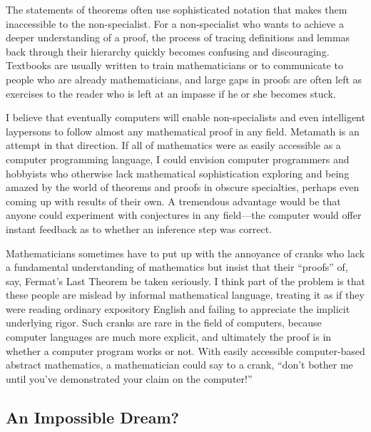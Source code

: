 The statements of theorems often use sophisticated notation that makes them
inaccessible to the non-specialist.  For a non-specialist who wants to achieve
a deeper understanding of a proof, the process of tracing definitions and
lemmas back through their hierarchy quickly becomes confusing
and discouraging.  Textbooks are usually written to train mathematicians or to
communicate to people who are already mathematicians, and large gaps in proofs
are often left as exercises to the reader who is left at an impasse if he or
she becomes stuck.

I believe that eventually computers will enable non-specialists and even
intelligent laypersons to follow almost any mathematical proof in any field.
Metamath is an attempt in that direction.  If all of mathematics were as
easily accessible as a computer programming language, I could envision
computer programmers and hobbyists who otherwise lack mathematical
sophistication exploring and being amazed by the world of theorems and proofs
in obscure specialties, perhaps even coming up with results of their own.  A
tremendous advantage would be that anyone could experiment with conjectures in
any field---the computer would offer instant feedback as to whether
an inference step was correct.

Mathematicians sometimes have to put up with the annoyance of
cranks who lack a fundamental understanding of mathematics but
insist that their ``proofs'' of, say, Fermat's Last Theorem be taken seriously.  I think part of the problem is that these
people are mislead by informal mathematical language, treating it as if they
were reading ordinary expository English and failing to appreciate the
implicit underlying rigor.  Such cranks are rare in the field of computers,
because computer languages are much more explicit, and ultimately the proof is
in whether a computer program works or not.  With easily accessible
computer-based abstract mathematics, a mathematician could say to a crank,
``don't bother me until you've demonstrated your claim on the computer!''

\vspace{-0.5em}

\subsection{An Impossible Dream?}\label{dream}

